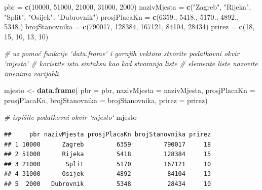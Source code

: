 \documentclass[]{book}
\newenvironment{Shaded}{\begin{snugshade}}{\end{snugshade}}
\newcommand{\KeywordTok}[1]{\textcolor[rgb]{0.13,0.29,0.53}{\textbf{#1}}}
\newcommand{\DataTypeTok}[1]{\textcolor[rgb]{0.13,0.29,0.53}{#1}}
\newcommand{\DecValTok}[1]{\textcolor[rgb]{0.00,0.00,0.81}{#1}}
\newcommand{\StringTok}[1]{\textcolor[rgb]{0.31,0.60,0.02}{#1}}
\newcommand{\CommentTok}[1]{\textcolor[rgb]{0.56,0.35,0.01}{\textit{#1}}}
\newcommand{\NormalTok}[1]{#1}
\theoremstyle{definition}
\theoremstyle{definition}
\theoremstyle{definition}
\theoremstyle{remark}
\begin{document}
\begin{Shaded}
\begin{Highlighting}[]
\NormalTok{pbr =}\StringTok{ }\KeywordTok{c}\NormalTok{(}\DecValTok{10000}\NormalTok{, }\DecValTok{51000}\NormalTok{, }\DecValTok{21000}\NormalTok{, }\DecValTok{31000}\NormalTok{, }\DecValTok{2000}\NormalTok{)}
\NormalTok{nazivMjesta =}\StringTok{ }\KeywordTok{c}\NormalTok{(}\StringTok{"Zagreb"}\NormalTok{, }\StringTok{"Rijeka"}\NormalTok{, }\StringTok{"Split"}\NormalTok{, }\StringTok{"Osijek"}\NormalTok{, }\StringTok{"Dubrovnik"}\NormalTok{)}
\NormalTok{prosjPlacaKn =}\StringTok{ }\KeywordTok{c}\NormalTok{(}\DecValTok{6359}\NormalTok{., }\DecValTok{5418}\NormalTok{., }\DecValTok{5170}\NormalTok{., }\DecValTok{4892}\NormalTok{., }\DecValTok{5348}\NormalTok{.)}
\NormalTok{brojStanovnika =}\StringTok{ }\KeywordTok{c}\NormalTok{(}\DecValTok{790017}\NormalTok{, }\DecValTok{128384}\NormalTok{, }\DecValTok{167121}\NormalTok{, }\DecValTok{84104}\NormalTok{, }\DecValTok{28434}\NormalTok{)}
\NormalTok{prirez =}\StringTok{ }\KeywordTok{c}\NormalTok{(}\DecValTok{18}\NormalTok{, }\DecValTok{15}\NormalTok{, }\DecValTok{10}\NormalTok{, }\DecValTok{13}\NormalTok{, }\DecValTok{10}\NormalTok{)}

\CommentTok{# uz pomoć funkcije `data.frame` i gornjih vektora stvorite podatkovni okvir `mjesto`}
\CommentTok{# koristite istu sintaksu kao kod stvaranja liste}
\CommentTok{# elemente liste nazovite imenima varijabli}

\NormalTok{mjesto <-}\StringTok{ }\KeywordTok{data.frame}\NormalTok{( }\DataTypeTok{pbr =}\NormalTok{ pbr,}
                      \DataTypeTok{nazivMjesta =}\NormalTok{ nazivMjesta,}
                      \DataTypeTok{prosjPlacaKn =}\NormalTok{ prosjPlacaKn,}
                      \DataTypeTok{brojStanovnika =}\NormalTok{ brojStanovnika,}
                      \DataTypeTok{prirez =}\NormalTok{ prirez)}

\CommentTok{# ispišite podatkovni okvir `mjesto`}
\NormalTok{mjesto}
\end{Highlighting}
\end{Shaded}

\begin{verbatim}
##     pbr nazivMjesta prosjPlacaKn brojStanovnika prirez
## 1 10000      Zagreb         6359         790017     18
## 2 51000      Rijeka         5418         128384     15
## 3 21000       Split         5170         167121     10
## 4 31000      Osijek         4892          84104     13
## 5  2000   Dubrovnik         5348          28434     10
\end{verbatim}
\end{document}
